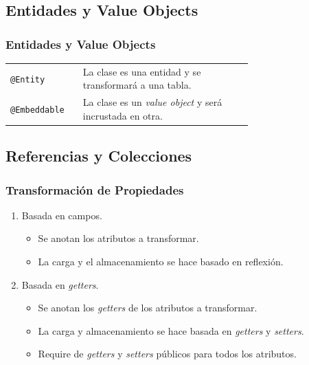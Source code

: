 \documentclass[handout,a4paper,slidestop,xcolor=pst,blue]{beamer}
\newcommand{\ann}[1]{\color{blue}\texttt{#1}\color{black}}
\begin{document}
\subsection{Entidades y Value Objects}

\begin{frame}[c]
    \frametitle{Entidades y Value Objects}
    \begin{tabular}{lp{0.70\linewidth}}
        \ann{@Entity}     & La clase es una entidad y se transformará a una tabla. \\
        \ann{@Embeddable} & La clase es un \emph{value object} y será incrustada en otra.
    \end{tabular}
\end{frame}

\subsection{Referencias y Colecciones}

\begin{frame}[c]
    \frametitle{Transformación de Propiedades}
    \begin{enumerate}[<+->]
        \item<1-> Basada en campos.
            \begin{itemize}
                \item<2-> Se anotan los atributos a transformar.
                \item<3-> La carga y el almacenamiento se hace basado en reflexión.
            \end{itemize}
        \item<3-> Basada en \emph{getters}.
            \begin{itemize}
                \item<4-> Se anotan los \emph{getters} de los atributos a transformar.
                \item<5-> La carga y almacenamiento se hace basada en \emph{getters} y \emph{setters}.
                \item<6-> Require de \emph{getters} y \emph{setters} públicos para todos los atributos.
            \end{itemize}
    \end{enumerate}
\end{frame}
\end{document}
